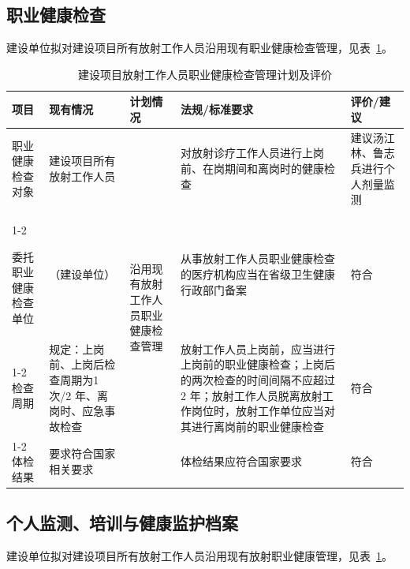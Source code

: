 \subsection{职业健康检查}

建设单位拟对建设项目所有放射工作人员沿用现有职业健康检查管理，见表~\ref{tab:ch8-3-t4-c29f11e5}。


\begin{table}[H]
\centering
\caption{建设项目放射工作人员职业健康检查管理计划及评价}
\label{tab:ch8-3-t4-c29f11e5}
\begin{tabular}{
|m{1.8cm}|m{2.4cm}|m{1.8cm}|m{5.2cm}|m{2.2cm}|
}
\hline
项目 & 现有情况 & 计划情况 & 法规/标准要求 & 评价/建议 \\
\hline
职业健康检查对象
& 建设项目所有放射工作人员
& \multirow{5}{=}{沿用现有放射工作人员职业健康检查管理}
& 对放射诊疗工作人员进行上岗前、在岗期间和离岗时的健康检查
& 建议汤江林、鲁志兵进行个人剂量监测 \\
\cline{1-2}\cline{4-5}

委托职业健康检查单位
& （建设单位）
&
& 从事放射工作人员职业健康检查的医疗机构应当在省级卫生健康行政部门备案
& 符合 \\
\cline{1-2}\cline{4-5}
检查周期
& 规定：上岗前、上岗后检查周期为1 次/2 年、离岗时、应急事故检查
&
& 放射工作人员上岗前，应当进行上岗前的职业健康检查；上岗后的两次检查的时间间隔不应超过 2 年；放射工作人员脱离放射工作岗位时，放射工作单位应当对其进行离岗前的职业健康检查
& 符合 \\
\cline{1-2}\cline{4-5}
体检结果
& 要求符合国家相关要求
&
& 体检结果应符合国家要求
& 符合 \\
\hline
\end{tabular}
\end{table}



\subsection{个人监测、培训与健康监护档案}

建设单位拟对建设项目所有放射工作人员沿用现有放射职业健康管理，见表~\ref{tab:ch8-3-t4-c29f11e5}。


